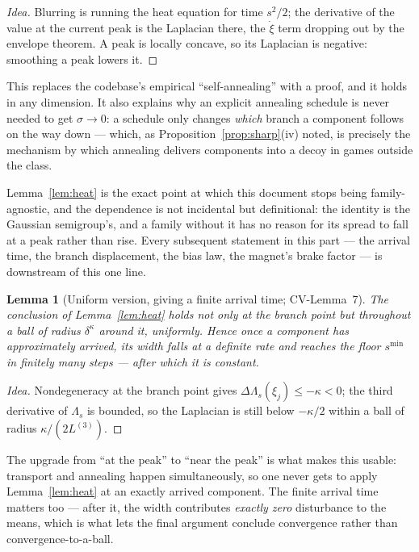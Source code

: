 \documentclass[11pt]{article}
\newtheorem{lemma}[theorem]{Lemma}
\theoremstyle{definition}
\newcommand{\CV}[1]{\textsf{CV-#1}}
\begin{document}
\begin{proof}[Idea]
Blurring is running the heat equation for time $s^2/2$; the derivative of the
value at the current peak is the Laplacian there, the $\dot\xi$ term dropping out
by the envelope theorem. A peak is locally concave, so its Laplacian is negative:
smoothing a peak lowers it.
\end{proof}

This replaces the codebase's empirical ``self-annealing'' with a proof, and it
holds in any dimension. It also explains why an explicit annealing schedule is
never needed to get $\sigma \to 0$: a schedule only changes \emph{which} branch a
component follows on the way down --- which, as Proposition~\ref{prop:sharp}(iv)
noted, is precisely the mechanism by which annealing delivers components into a
decoy in games outside the class.

Lemma~\ref{lem:heat} is the exact point at which this document stops being
family-agnostic, and the dependence is not incidental but definitional: the
identity is the Gaussian semigroup's, and a family without it has no reason for
its spread to fall at a peak rather than rise. Every subsequent statement in this
part --- the arrival time, the branch displacement, the bias law, the magnet's
brake factor --- is downstream of this one line.

\begin{lemma}[Uniform version, giving a finite arrival time;
\CV{Lemma~7}]\label{lem:arrive}
The conclusion of Lemma~\ref{lem:heat} holds not only \emph{at} the branch point
but throughout a ball of radius $\delta^\kappa$ around it, uniformly. Hence once a
component has \emph{approximately} arrived, its width falls at a definite rate and
reaches the floor $s^{\min}$ in finitely many steps --- after which it is constant.
\end{lemma}

\begin{proof}[Idea]
Nondegeneracy at the branch point gives $\Delta\Lambda_s(\xi_j) \le -\kappa < 0$;
the third derivative of $\Lambda_s$ is bounded, so the Laplacian is still below
$-\kappa/2$ within a ball of radius $\kappa/(2L^{(3)})$.
\end{proof}

The upgrade from ``at the peak'' to ``near the peak'' is what makes this usable:
transport and annealing happen simultaneously, so one never gets to apply
Lemma~\ref{lem:heat} at an exactly arrived component. The finite arrival time
matters too --- after it, the width contributes \emph{exactly zero} disturbance to
the means, which is what lets the final argument conclude convergence rather than
convergence-to-a-ball.
\end{document}
